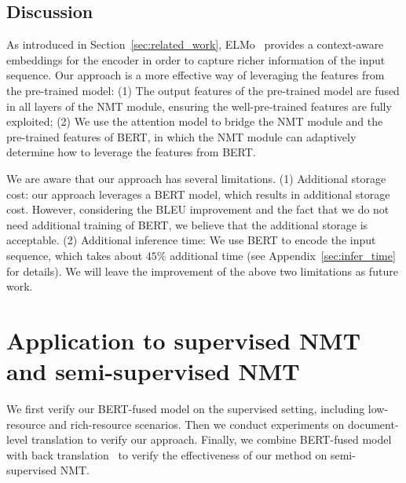 \documentclass{article} \usepackage{iclr2020_conference,times}
\begin{document}
\subsection{Discussion}


 As introduced in Section~\ref{sec:related_work}, ELMo~\citep{peters2018deep} provides a context-aware embeddings for the encoder in order to capture richer information of the input sequence. Our approach is a more effective way of leveraging the features from the pre-trained model: (1) The output features of the pre-trained model are fused in all layers of the NMT module, ensuring the well-pre-trained features are fully exploited; (2) We use the attention model to bridge the NMT module and the pre-trained features of BERT, in which the NMT module can adaptively determine how to leverage the features from BERT.



 We are aware that our approach has several limitations. (1) Additional storage cost: our approach leverages a BERT model, which results in additional storage cost. However, considering the BLEU improvement and the fact that we do not need additional training of BERT, we believe that the additional storage is acceptable. (2) Additional inference time: We use BERT to encode the input sequence, which takes about $45\%$ additional time (see Appendix~\ref{sec:infer_time} for details). We will leave the improvement of the above two limitations as future work.

\section{Application to supervised NMT and semi-supervised NMT}\label{sec:supervised_nmt}
We first verify our BERT-fused model on the supervised setting, including low-resource and rich-resource scenarios. Then we conduct experiments on document-level translation to verify our approach. Finally, we combine BERT-fused model with back translation~\citep{sennrich2016improving} to verify the effectiveness of our method on semi-supervised NMT.
\end{document}
